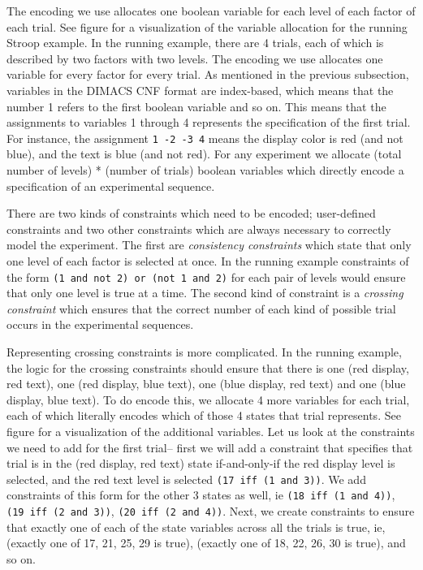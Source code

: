 The encoding we use allocates one boolean variable for each level of each factor of each trial. See figure  for a visualization of the variable allocation for the running Stroop example. In the running example, there are 4 trials, each of which is described by two factors with two levels. The encoding we use allocates one variable for every factor for every trial. As mentioned in the previous subsection, variables in the DIMACS CNF format are index-based, which means that the number 1 refers to the first boolean variable and so on. This means that the assignments to variables 1 through 4 represents the specification of the first trial. For instance, the assignment \texttt{1 -2 -3 4} means the display color is red (and not blue), and the text is blue (and not red). For any experiment we allocate (total number of levels) * (number of trials) boolean variables which directly encode a specification of an experimental sequence.






There are two kinds of constraints which need to be encoded; user-defined constraints and two other constraints which are always necessary to correctly model the experiment. The first are \emph{consistency constraints} which state that only one level of each factor is selected at once. In the running example constraints of the form \texttt{(1 and not 2) or (not 1 and 2)} for each pair of levels would ensure that only one level is true at a time. The second kind of constraint is a \emph{crossing constraint} which ensures that the correct number of each kind of possible trial occurs in the experimental sequences.

Representing crossing constraints is more complicated. In the running example, the logic for the crossing constraints should ensure that there is one (red display, red text), one (red display, blue text), one (blue display, red text) and one (blue display, blue text). To do encode this, we allocate 4 more variables for each trial, each of which literally encodes which of those 4 states that trial represents. See figure  for a visualization of the additional variables. Let us look at the constraints we need to add for the first trial-- first we will add a constraint that specifies that trial is in the (red display, red text) state if-and-only-if the red display level is selected, and the red text level is selected \texttt{(17 iff (1 and 3))}. We add constraints of this form for the other 3 states as well, ie \texttt{(18 iff (1 and 4))}, \texttt{(19 iff (2 and 3))}, \texttt{(20 iff (2 and 4))}. Next, we create constraints to ensure that exactly one of each of the state variables across all the trials is true, ie, (exactly one of 17, 21, 25, 29 is true), (exactly one of 18, 22, 26, 30 is true), and so on.

